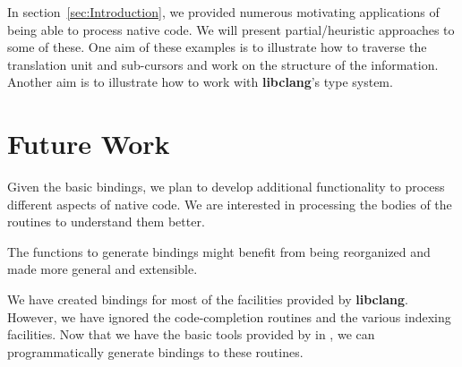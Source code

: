 \documentclass[article]{jss}
\def\R{\proglang{R}}
\def\Rpkg#1{\pkg{#1}}
\def\libclang{\textbf{libclang}}
\begin{document}
In section~\ref{sec:Introduction}, we provided numerous motivating
applications of being able to process native code.  We will present
partial/heuristic approaches to some of these.  One aim of these
examples is to illustrate how to traverse the translation unit and
sub-cursors and work on the structure of the information.  Another aim
is to illustrate how to work with \libclang's type system.








\section{Future Work}

Given the basic bindings, we plan to develop additional functionality
to process different aspects of native code. We are interested in
processing the bodies of the routines to understand them better.

The functions to generate bindings might benefit from being
reorganized and made more general and extensible.

We have created bindings for most of the facilities provided by
\libclang.  However, we have ignored the code-completion routines and
the various indexing facilities.  Now that we have the basic tools
provided by \Rpkg{RCIndex} in \R, we can programmatically generate
bindings to these routines. 



\end{document}
